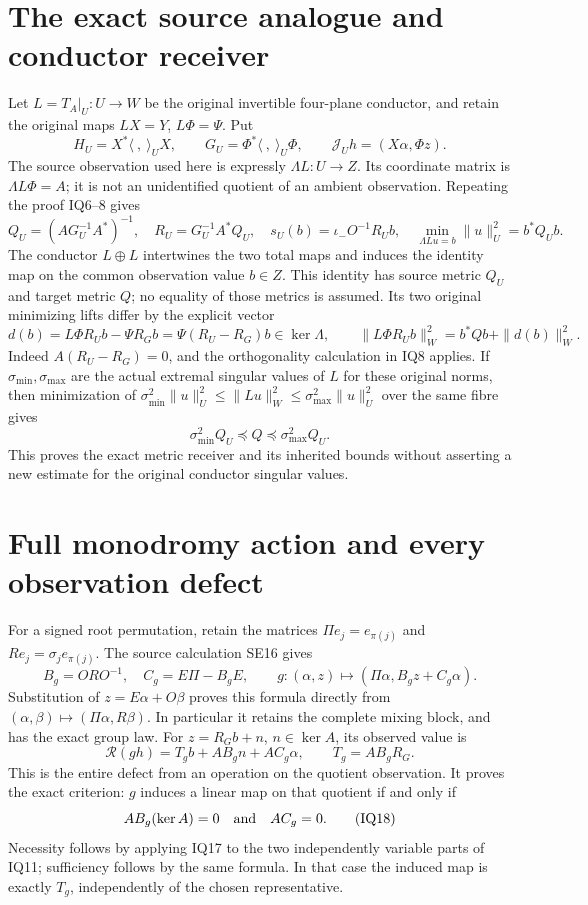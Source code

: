 \section{The exact source analogue and conductor receiver}
Let $L=T_A|_U:U\to W$ be the original invertible four-plane conductor,
and retain the original maps $LX=Y$, $L\Phi=\Psi$.  Put
\[
 H_U=X^*\langle\ ,\ \rangle_UX,\qquad
 G_U=\Phi^*\langle\ ,\ \rangle_U\Phi,
 \qquad\mathcal J_Uh=(X\alpha,\Phi z).               \tag{IQ12}
\]
The source observation used here is expressly $\Lambda L:U\to Z$.
Its coordinate matrix is $\Lambda L\Phi=A$; it is not an unidentified
quotient of an ambient observation.  Repeating the proof IQ6--8 gives
\[
 Q_U=(AG_U^{-1}A^*)^{-1},\quad R_U=G_U^{-1}A^*Q_U,
 \quad s_U(b)=\iota_-O^{-1}R_Ub,\quad
 \min_{\Lambda Lu=b}\|u\|_U^2=b^*Q_Ub.              \tag{IQ13}
\]
The conductor $L\oplus L$ intertwines the two total maps and induces the
identity map on the common observation value $b\in Z$.  This identity has
source metric $Q_U$ and target metric $Q$; no equality of those metrics is
assumed.  Its two original minimizing lifts differ by the explicit vector
\[
 d(b)=L\Phi R_Ub-\Psi R_Gb
     =\Psi(R_U-R_G)b\in\ker\Lambda,\qquad
 \|L\Phi R_Ub\|_W^2=b^*Qb+\|d(b)\|_W^2.            \tag{IQ14}
\]
Indeed $A(R_U-R_G)=0$, and the orthogonality calculation in IQ8 applies.
If $\sigma_{\min},\sigma_{\max}$ are the actual extremal singular values
of $L$ for these original norms, then minimization of
$\sigma_{\min}^2\|u\|_U^2\le\|Lu\|_W^2
\le\sigma_{\max}^2\|u\|_U^2$ over the same fibre gives
\[
 \sigma_{\min}^2 Q_U\preceq Q\preceq\sigma_{\max}^2 Q_U. \tag{IQ15}
\]
This proves the exact metric receiver and its inherited bounds without
asserting a new estimate for the original conductor singular values.

\section{Full monodromy action and every observation defect}
For a signed root permutation, retain the matrices
$\Pi e_j=e_{\pi(j)}$ and $Re_j=\sigma_j e_{\pi(j)}$.
The source calculation SE16 gives
\[
 B_g=ORO^{-1},\quad C_g=E\Pi-B_gE,\qquad
 g:(\alpha,z)\longmapsto(\Pi\alpha,B_gz+C_g\alpha).
                                                               \tag{IQ16}
\]
Substitution of $z=E\alpha+O\beta$ proves this formula directly from
$(\alpha,\beta)\mapsto(\Pi\alpha,R\beta)$.  In particular it retains
the complete mixing block, and has the exact group law.  For
$z=R_Gb+n$, $n\in\ker A$, its observed value is
\[
 \mathcal R(gh)=T_gb+AB_gn+AC_g\alpha,\qquad
 T_g=AB_gR_G.                                         \tag{IQ17}
\]
This is the entire defect from an operation on the quotient observation.
It proves the exact criterion: $g$ induces a linear map on that quotient
if and only if
\[
 AB_g(\ker A)=0\quad\hbox{and}\quad AC_g=0.          \tag{IQ18}
\]
Necessity follows by applying IQ17 to the two independently variable
parts of IQ11; sufficiency follows by the same formula.  In that case
the induced map is exactly $T_g$, independently of the chosen representative.

